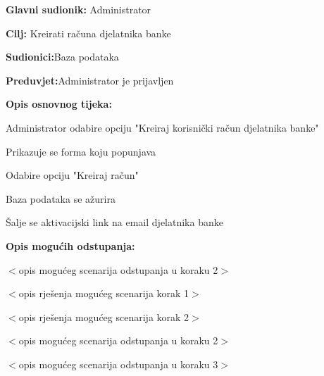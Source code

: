 \noindent {}
\begin{packed_item}
	
	\item \textbf{Glavni sudionik: }{Administrator}
	\item  \textbf{Cilj:} {Kreirati računa djelatnika banke}
	\item  \textbf{Sudionici:}{Baza podataka}
	\item  \textbf{Preduvjet:}{Administrator je prijavljen}
	\item  \textbf{Opis osnovnog tijeka:}
	
	\item[] \begin{packed_enum}
		
		\item {Administrator odabire opciju "Kreiraj korisnički račun djelatnika banke"}
		\item {Prikazuje se forma koju popunjava} 
		\item {Odabire opciju "Kreiraj račun"}
		\item {Baza podataka se ažurira}
		\item {Šalje se aktivacijski link na email djelatnika banke}
	\end{packed_enum}
	
	\item  \textbf{Opis mogućih odstupanja:}
	
	\item[] \begin{packed_item}
		
		\item[2.a] $<$opis mogućeg scenarija odstupanja u koraku 2$>$
		\item[] \begin{packed_enum}
			
			\item $<$opis rješenja mogućeg scenarija korak 1$>$
			\item $<$opis rješenja mogućeg scenarija korak 2$>$
			
		\end{packed_enum}
		\item[2.b] $<$opis mogućeg scenarija odstupanja u koraku 2$>$
		\item[3.a] $<$opis mogućeg scenarija odstupanja  u koraku 3$>$
		
	\end{packed_item}
\end{packed_item}
\eject 
\noindent {}
